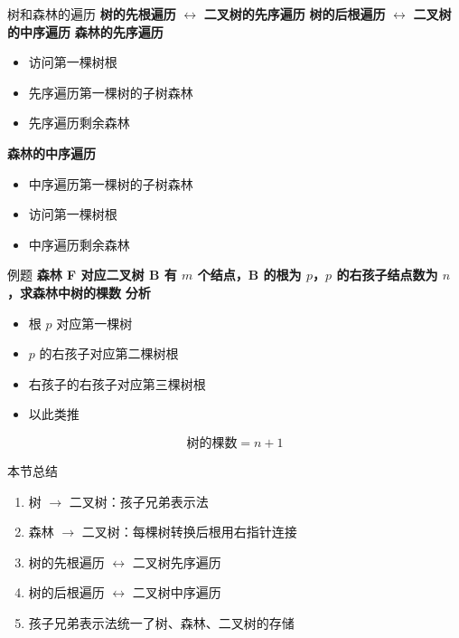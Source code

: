 \documentclass[10pt, aspectratio=169]{beamer}
\begin{document}
\begin{frame}{树和森林的遍历}
    \textbf{树的先根遍历} $\leftrightarrow$ \textbf{二叉树的先序遍历}
    \vspace{0.3em}
    \textbf{树的后根遍历} $\leftrightarrow$ \textbf{二叉树的中序遍历}
    \vspace{0.5em}
    \textbf{森林的先序遍历}
    \begin{itemize}
        \item 访问第一棵树根
        \item 先序遍历第一棵树的子树森林
        \item 先序遍历剩余森林
    \end{itemize}
    \vspace{0.3em}
    \textbf{森林的中序遍历}
    \begin{itemize}
        \item 中序遍历第一棵树的子树森林
        \item 访问第一棵树根
        \item 中序遍历剩余森林
    \end{itemize}
\end{frame}

\begin{frame}{例题}
    \textbf{森林 F 对应二叉树 B 有 $m$ 个结点，B 的根为 $p$，$p$ 的右孩子结点数为 $n$，求森林中树的棵数}
    \vspace{0.5em}
    \textbf{分析}
    \begin{itemize}
        \item 根 $p$ 对应第一棵树
        \item $p$ 的右孩子对应第二棵树根
        \item 右孩子的右孩子对应第三棵树根
        \item 以此类推
    \end{itemize}
    \vspace{0.5em}
    \[
    \boxed{\text{树的棵数} = n + 1}
    \]
\end{frame}

\begin{frame}{本节总结}
    \begin{enumerate}
        \item 树 $\to$ 二叉树：孩子兄弟表示法
        \item 森林 $\to$ 二叉树：每棵树转换后根用右指针连接
        \item 树的先根遍历 $\leftrightarrow$ 二叉树先序遍历
        \item 树的后根遍历 $\leftrightarrow$ 二叉树中序遍历
        \item 孩子兄弟表示法统一了树、森林、二叉树的存储
    \end{enumerate}
\end{frame}
\end{document}
